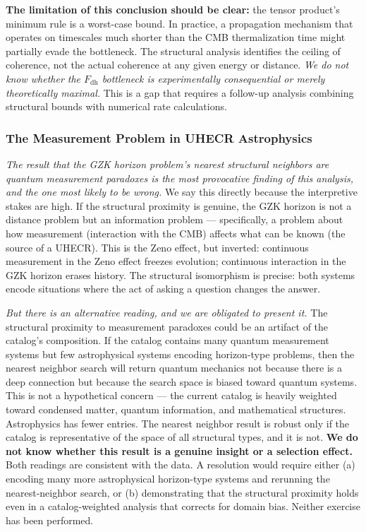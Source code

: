 \documentclass[12pt,a4paper]{article}
\begin{document}
\textbf{The limitation of this conclusion should be clear:} the tensor product's minimum rule is a worst-case bound. In practice, a propagation mechanism that operates on timescales much shorter than the CMB thermalization time might partially evade the bottleneck. The structural analysis identifies the ceiling of coherence, not the actual coherence at any given energy or distance. \emph{We do not know whether the $F_{\text{dh}}$ bottleneck is experimentally consequential or merely theoretically maximal.} This is a gap that requires a follow-up analysis combining structural bounds with numerical rate calculations.

\subsubsection{The Measurement Problem in UHECR Astrophysics}

\emph{The result that the GZK horizon problem's nearest structural neighbors are quantum measurement paradoxes is the most provocative finding of this analysis, and the one most likely to be wrong.} We say this directly because the interpretive stakes are high. If the structural proximity is genuine, the GZK horizon is not a distance problem but an information problem --- specifically, a problem about how measurement (interaction with the CMB) affects what can be known (the source of a UHECR). This is the Zeno effect, but inverted: continuous measurement in the Zeno effect freezes evolution; continuous interaction in the GZK horizon erases history. The structural isomorphism is precise: both systems encode situations where the act of asking a question changes the answer.

\emph{But there is an alternative reading, and we are obligated to present it.} The structural proximity to measurement paradoxes could be an artifact of the catalog's composition. If the catalog contains many quantum measurement systems but few astrophysical systems encoding horizon-type problems, then the nearest neighbor search will return quantum mechanics not because there is a deep connection but because the search space is biased toward quantum systems. This is not a hypothetical concern --- the current catalog is heavily weighted toward condensed matter, quantum information, and mathematical structures. Astrophysics has fewer entries. The nearest neighbor result is robust only if the catalog is representative of the space of all structural types, and it is not. \textbf{We do not know whether this result is a genuine insight or a selection effect.} Both readings are consistent with the data. A resolution would require either (a) encoding many more astrophysical horizon-type systems and rerunning the nearest-neighbor search, or (b) demonstrating that the structural proximity holds even in a catalog-weighted analysis that corrects for domain bias. Neither exercise has been performed.
\end{document}
